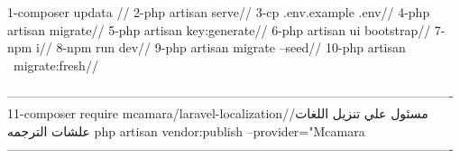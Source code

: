 1-composer updata //
2-php artisan serve//
3-cp .env.example .env//
4-php artisan migrate//
5-php artisan key:generate//
6-php artisan ui bootstrap//
7-npm i//
8-npm run dev//
9-php artisan migrate --seed//
10-php artisan  migrate:fresh//

----------------------------------------------------------------------------------------------------------
11-composer require mcamara/laravel-localization//مسئول علي تنزيل اللغات علشات الترجمه 
php artisan vendor:publish --provider="Mcamara\LaravelLocalization\LaravelLocalizationServiceProvider
----------------------------------------------------------------------------------------------------------
